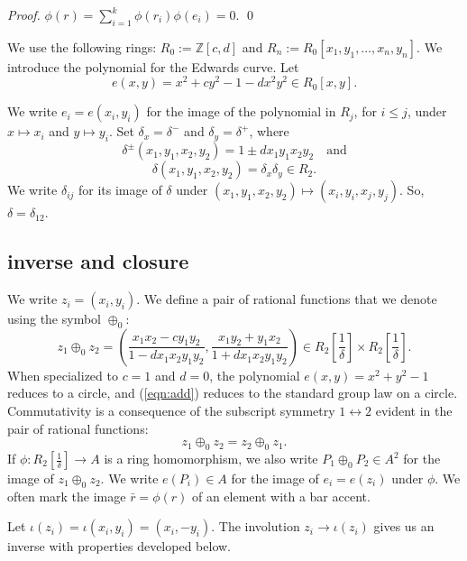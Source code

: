 \documentclass{llncs}
\newcommand{\ring}[1]{\mathbb{#1}}
\newcommand{\f}[1]{\frac{1}{#1}}
\begin{document}
\begin{proof}
$\phi(r) = \sum_{i=1}^k \phi(r_i) \phi(e_i) = 0.$
\qed\end{proof}

We use the following rings: $R_0 := \ring{Z}[c,d]$ and $R_n :=
R_0[x_1,y_1,\ldots,x_n,y_n]$.  We introduce the polynomial for the
Edwards curve.  Let
\begin{equation}
e(x,y) = x^2 + c y^2 -1 - d x^2 y^2 \in  R_0[x,y].
\end{equation}

We write $e_i = e(x_i,y_i)$ for the image of the polynomial in $R_j$,
for $i\le j$, under $x\mapsto x_i$ and $y\mapsto y_i$.  Set
$\delta_x = \delta^-$ and $\delta_y = \delta^+$, where
\[\delta^{\pm} (x_1,y_1,x_2,y_2) = 1\pm d x_1 y_1 x_2 y_2\quad\text{and}\] 
\[
\delta(x_1,y_1,x_2,y_2) = \delta_x\delta_y\in R_2.
\]
We write $\delta_{ij}$ for its image of $\delta$ under
$(x_1,y_1,x_2,y_2)\mapsto (x_i,y_i,x_j,y_j)$.  So,
$\delta=\delta_{12}$.

\subsection{inverse and closure}

We write $z_i = (x_i,y_i)$.
We define a pair of rational functions that we denote using
the symbol $\oplus_0$:
\begin{equation}\label{eqn:add}
z_1 \oplus_0 z_2 =  \left(\frac{x_1 x_2 - c y_1 y_2}{1 - d x_1 x_2 y_1 y_2},
\frac{x_1 y_2 + y_1 x_2}{1+d x_1 x_2 y_1 y_2}\right) 
\in R_2[\f{\delta}]\times R_2[\f{\delta}].
\end{equation}
When specialized to $c=1$ and $d=0$, the polynomial $e(x,y)=x^2+y^2-1$ reduces to
a circle, and (\ref{eqn:add}) reduces to the standard group
law on a circle.
Commutativity is a consequence of the subscript symmetry
$1\leftrightarrow 2$ evident in the pair of rational functions:
\[
z_1 \oplus_0 z_2 = z_2\oplus_0 z_1.
\]
If $\phi:R_2[\f{\delta}]\to A$ is a ring homomorphism, we also write
$P_1\oplus_0 P_2\in A^2$ for the image of $z_1\oplus_0 z_2$.  We write
$e(P_i)\in A$ for the image of $e_i=e(z_i)$ under $\phi$.  We often
mark the image $\bar r=\phi(r)$ of an element with a bar accent.

Let $\iota(z_i) =\iota(x_i,y_i) = (x_i,-y_i)$.  The involution $z_i\to
\iota(z_i)$ gives us an inverse with properties developed below.
\end{document}
